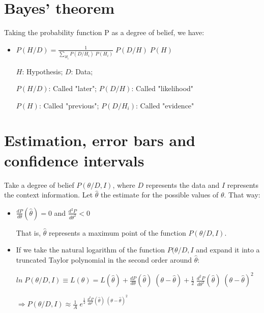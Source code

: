 \documentclass{article}
\begin{document}
\section{Bayes' theorem}

Taking the probability function P as a degree of belief, we have:

\begin{itemize}

\item $P(H/D) = \frac{1}{\sum\limits_{H_{i}} P(D/H_{i}) \; P(H_{i})} \; P(D/H) \; P(H)$

$H$: Hypothesis; $D$: Data;

$P(H/D)$: Called "later"; $P(D/H)$: Called "likelihood"

$P(H)$: Called "previous"; $P(D/H_{i})$: Called "evidence"

\end{itemize}

\section{Estimation, error bars and confidence intervals}

Take a degree of belief $P(\theta/D,I)$, where $D$ represents the data and $I$ represents the context information. Let $\hat{\theta}$ the estimate for the possible values of $\theta$. That way:

\begin{itemize}

\item $\frac{dP}{d\theta} (\hat{\theta}) = 0$ and $\frac{d^{2}P}{d\theta^{2}} < 0$

That is, $\hat{\theta}$ represents a maximum point of the function $P(\theta/D,I)$.

\item If we take the natural logarithm of the function $P(\theta/D,I$ and expand it into a truncated Taylor polynomial in the second order around $\hat{\theta}$:

$ln \; P(\theta/D,I) \equiv L(\theta) = L(\hat{\theta}) + \frac{dP}{d\theta} (\hat{\theta}) \; (\theta - \hat{\theta}) + \frac{1}{2} \; \frac{d^{2}P}{d\theta^{2}} (\hat{\theta}) \; (\theta - \hat{\theta})^{2}$

$\Rightarrow P(\theta/D,I) \approx \frac{1}{A} \; e^{\frac{1}{2} \; \frac{d^{2}P}{d\theta^{2}} (\hat{\theta}) \; (\theta - \hat{\theta})^{2}}$

\end{itemize}
\end{document}
